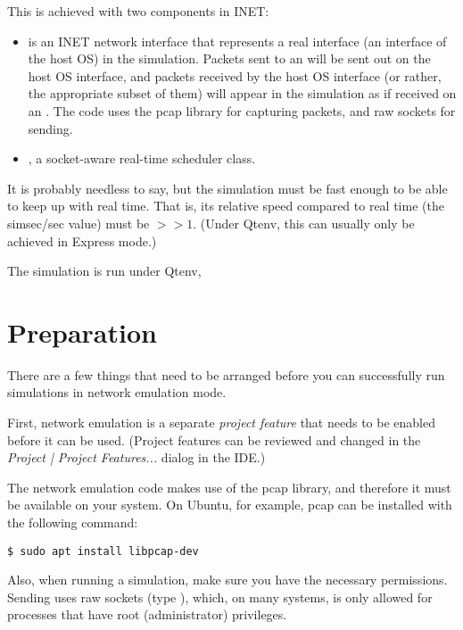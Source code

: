 This is achieved with two components in INET:

\begin{itemize}
  \item {} is an INET network interface that represents
    a real interface (an interface of the host OS) in the simulation.
    Packets sent to an  will be sent out on the
    host OS interface, and packets received by the host OS interface
    (or rather, the appropriate subset of them) will appear in the
    simulation as if received on an . The code
    uses the pcap library for capturing packets, and raw sockets for sending.
 \item {}, a socket-aware real-time scheduler class.
\end{itemize}

\begin{note}
It is probably needless to say, but the simulation must be fast enough
to be able to keep up with real time. That is, its relative speed compared
to real time (the simsec/sec value) must be $>>1$.  (Under Qtenv, this
can usually only be achieved in Express mode.)
\end{note}

The simulation is run under Qtenv,

\section{Preparation}
\label{sec:emulation:preparation}

There are a few things that need to be arranged before you can successfully
run simulations in network emulation mode.

First, network emulation is a separate \textit{project feature} that needs to
be enabled before it can be used. (Project features can be reviewed and changed
in the \emph{Project | Project Features...} dialog in the IDE.)

The network emulation code makes use of the pcap library, and therefore
it must be available on your system. On Ubuntu, for example, pcap can be
installed with the following command:

\begin{verbatim}
$ sudo apt install libpcap-dev
\end{verbatim}

Also, when running a simulation, make sure you have the necessary permissions.
Sending uses raw sockets (type ), which, on many systems,
is only allowed for processes that have root (administrator) privileges.


